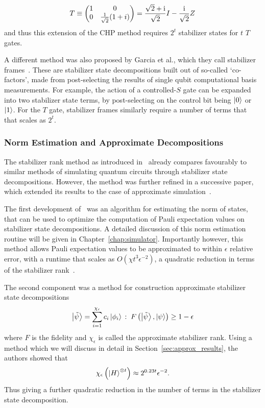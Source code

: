 \[T\equiv \begin{pmatrix}1 & 0 \\ 0 & \frac{1}{\sqrt{2}}(1+i)\end{pmatrix} = \frac{\sqrt{2}+\mathrm{i}}{\sqrt{2}}I-\frac{\mathrm{i}}{\sqrt{2}}Z \]
and thus this extension of the CHP method requires $2^{t}$ stabilizer states for $t$ $T$ gates.\par
A different method was also proposed by Garcia et al., which they call stabilizer frames~\cite{Garcia2015}. These are stabilizer state decompositions built out of so-called `co-factors', made from post-selecting the results of single qubit computational basis measurements. For example, the action of a controlled-$S$ gate can be expanded into two stabilizer state terms, by post-selecting on the control bit being $\ket{0}$ or $\ket{1}$. For the $T$ gate, stabilizer frames similarly require a number of terms that that scales as $2^{t}$.
\subsubsection*{Norm Estimation and Approximate Decompositions}
The stabilizer rank method as introduced in~\cite{Bravyi2015} already compares favourably to similar methods of simulating quantum circuits through stabilizer state decompositions. However, the method was further refined in a successive paper, which extended its results to the case of approximate simulation~\cite{Bravyi2016}.\par
The first development of~\cite{Bravyi2016} was an algorithm for estimating the norm of states, that can be used to optimize the computation of Pauli expectation values on stabilizer state decompositions. A detailed discussion of this norm estimation routine will be given in Chapter~\ref{chap:simulator}. Importantly however, this method allows Pauli expectation values to be approximated to within $\epsilon$ relative error, with a runtime that scales as $O(\chi t^{3}\epsilon^{-2})$, a quadratic reduction in terms of the stabilizer rank~\cite{Bravyi2016}.\par
The second component was a method for construction approximate stabilizer state decompositions
\begin{equation}
\ket{\tilde{\psi}}=\sum_{i=1}^{\chi_{\epsilon}}c_{i}\ket{\phi_{i}}\,:\;F\left(\ket{\tilde{\psi}},\ket{\psi}\right)\geq1-\epsilon
\label{eq:old_approx_rank}
\end{equation}
where $F$ is the fidelity and $\chi_{\epsilon}$ is called the approximate stabilizer rank. Using a method which we will discuss in detail in Section~\ref{sec:approx_results}, the authors showed that
\begin{equation}
\chi_{\epsilon}\left(\ket{H}^{\otimes t}\right)\approx 2^{0.23t}\epsilon^{-2}.
\label{eq:approx_t_rank}
\end{equation}
Thus giving a further quadratic reduction in the number of terms in the stabilizer state decomposition.\par
